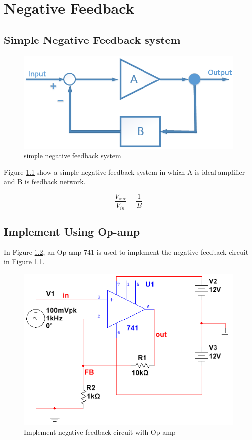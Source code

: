 \chapter{Negative Feedback}
\section{Simple Negative Feedback system}

\begin{figure}[htbp]
	\centering
	\includegraphics[scale=0.7]{"../Photo/Chap2/Feedback system"}
	\caption{simple negative feedback system}
	\label{fig:Feedback system}
\end{figure}

Figure \ref{fig:Feedback system} show a simple negative feedback  system in \cite{Negativefeedback}which A is ideal amplifier and B is feedback network. 

\[  \frac{V_{out}}{V_{in}} = \frac{1}{B}  \] 
 



\section{Implement Using Op-amp}

In Figure \ref{fig:Op-amp feedback}, an Op-amp 741 is used to implement the negative feedback circuit in Figure \ref{fig:Feedback system}.

\begin{figure}[htbp]
	\centering
	\includegraphics[scale=0.7]{"../Photo/Chap2/Op-amp feedback"}
	\caption{Implement negative feedback circuit with Op-amp}
	\label{fig:Op-amp feedback}
\end{figure}




